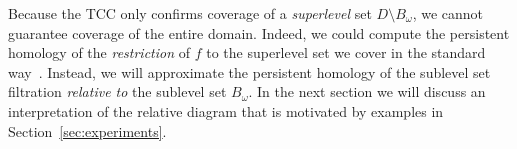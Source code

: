 

%

Because the TCC only confirms coverage of a \emph{superlevel} set $D\setminus B_\omega$, we cannot guarantee coverage of the entire domain.
Indeed, we could compute the persistent homology of the \emph{restriction} of $f$ to the superlevel set we cover in the standard way~\cite{chazal09analysis}.
Instead, we will approximate the persistent homology of the sublevel set filtration \emph{relative to} the sublevel set $B_\omega$.
In the next section we will discuss an interpretation of the relative diagram that is motivated by examples in Section~\ref{sec:experiments}.

